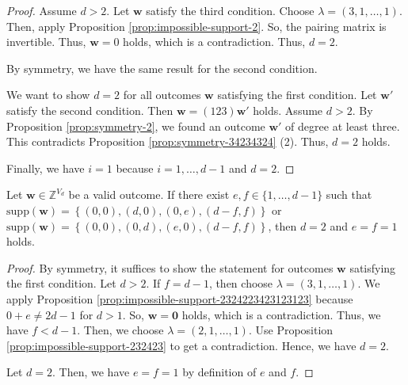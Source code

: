 \begin{proof}


    Assume \( d > 2 \). Let \( \mathbf{w} \) satisfy the third condition. Choose \( \lambda = (3,1, \dots, 1) \). Then, apply Proposition \ref{prop:impossible-support-2}. So, the pairing matrix is invertible. Thus, \( \mathbf{w} = 0 \) holds, which is a contradiction. Thus, \( d = 2 \).
    
    By symmetry, we have the same result for the second condition.

    We want to show \( d=2 \) for all outcomes \( \mathbf{w} \) satisfying the first condition. Let \( \mathbf{w}' \) satisfy the second condition. Then \( \mathbf{w} = (123) \mathbf{w}' \) holds. Assume \( d > 2 \). By Proposition \ref{prop:symmetry-2}, we found an outcome \( \mathbf{w}' \) of degree at least three. This contradicts Proposition \ref{prop:symmetry-34234324} (2). Thus, \( d = 2 \) holds.

    Finally, we have \( i = 1 \) because \( i = 1, \dots, d-1 \) and \( d = 2 \).
\end{proof}

\begin{proposition}\label{prop:symmetry-232lkmlksm}
    Let \( \mathbf{w} \in \mathbb{Z}^{V_d} \) be a valid outcome. If there exist \( e,f \in \{1 , \dots, d-1\} \) such that \( \mathrm{supp}(\mathbf{w}) = \left\{ (0,0), (d,0), (0,e), (d-f,f) \right\} \)  or  \( \mathrm{supp}(\mathbf{w}) = \left\{ (0,0), (0,d), (e,0), (d-f,f) \right\} \), then \( d = 2 \) and \( e = f = 1 \) holds.
\end{proposition}

\begin{proof}
    By symmetry, it suffices to show the statement for outcomes \( \mathbf{w} \) satisfying the first condition. Let \( d > 2 \). If \( f = d-1 \), then choose \( \lambda = (3,1,\dots,1) \). We apply Proposition \ref{prop:impossible-support-2324223423123123} because \( 0 + e \neq 2d - 1 \) for \( d > 1 \). So, \( \mathbf{w} = \mathbf 0\) holds, which is a contradiction. Thus, we have \( f < d-1 \). Then, we choose \( \lambda = (2, 1, \dots, 1) \). Use Proposition \ref{prop:impossible-support-232423} to get a contradiction. Hence, we have \( d = 2 \).

    Let \( d = 2 \). Then, we have \( e = f = 1 \) by definition of \( e \) and \( f \).
\end{proof}

